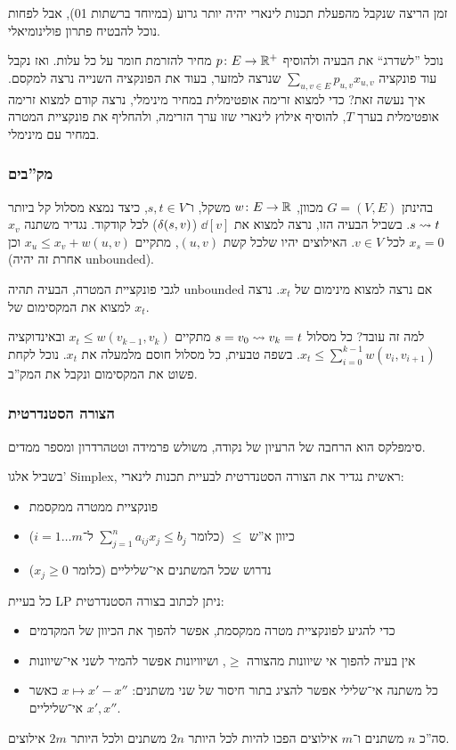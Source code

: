 \documentclass[]{../../../../tex/classes/styledArticle}
\begin{document}
	זמן הריצה שנקבל מהפעלת תכנות לינארי יהיה יותר גרוע (במיוחד ברשתות 01), אבל לפחות נוכל להבטיח פתרון פולינומיאלי. 
	
	נוכל ''לשדרג`` את הבעיה ולהוסיף $p \colon E \to \mathbb{R}^{+}$ מחיר להזרמת חומר על כל עלות. ואז נקבל עוד פונקציה $\sum_{u, v \in E}p_{u, v}x_{u, v}$ שנרצה למזער, בעוד את הפונקציה השנייה נרצה למקסם. איך נעשה זאת? כדי למצוא זרימה אופטימלית במחיר מינימלי, נרצה קודם למצוא זרימה אופטימלית בערך $T$, להוסיף אילוץ לינארי שזו ערך הזרימה, ולהחליף את פונקציית המטרה במחיר עם מינימלי. 
	
	\subsubsection*{מק''בים}
	בהינתן $G = (V, E)$ מכוון, $w \colon E \to \mathbb{R}$ משקל, ו־$s, t \in V$, כיצד נמצא מסלול קל ביותר $s \rightsquigarrow t$. בשביל הבעיה הזו, נרצה למצוא את $\dd[v]$ ($\delta(s, v)$) לכל קודקוד. נגדיר משתנה $x_v$  לכל $ v\in V$. האילוצים יהיו שלכל קשת $(u, v)$, מתקיים $x_u \le x_v + w(u, v)$ וכן $x_s = 0$ (אחרת זה יהיה unbounded). 
	
	לגבי פונקציית המטרה, הבעיה תהיה unbounded אם נרצה למצוא מינימום של $x_t$. נרצה למצוא את המקסימום של $x_t$. 
	
	למה זה עובד? כל מסלול $s = v_0 \rightsquigarrow v_k = t$ מתקיים $x_t \le w(v_{k - 1}, v_k)$ ובאינדוקציה $x_t \le \sum_{i = 0}^{k -1} w(v_i, v_{i + 1})$. בשפה טבעית, כל מסלול חוסם מלמעלה את $x_t$. נוכל לקחת פשוט את המקסימום ונקבל את המק''ב. 
	
	\subsubsection*{הצורה הסטנדרטית}
	סימפלקס הוא הרחבה של הרעיון של נקודה, משולש פרמידה וטטהרדרון ומספר ממדים. 
	
	בשביל אלגו' Simplex, ראשית נגדיר את הצורה הסטנדרטית לבעיית תכנות לינארי: 
	\begin{itemize}
		\item פונקציית ממטרה ממקסמת
		\item כיוון א''ש $\le$ (כלומר $\sum_{j = 1}^{n} a_{ij}x_j \le b_j$ ל־$i = 1 \dots m$) 
		\item נדרוש שכל המשתנים אי־שליליים (כלומר $x_j \ge 0$)
	\end{itemize}
	כל בעיית LP ניתן לכתוב בצורה הסטנדרטית: 
	\begin{itemize}
		\item כדי להגיע לפונקציית מטרה ממקסמת, אפשר להפוך את הכיוון של המקדמים
		\item אין בעיה להפוך אי שיוונות מהצורה $\ge$, ושיוויונות אפשר להמיר לשני אי־שיוונות
		\item כל משתנה אי־שלילי אפשר להציג בתור חיסור של שני משתנים: $x \mapsto x' - x''$ כאשר $x', x''$ אי־שליליים. 
	\end{itemize}
	סה''כ $n$ משתנים ו־$m$ אילוצים הפכו להיות לכל היותר $2n$ משתנים ולכל היותר $2m$ אילוצים. 
	
\end{document}
